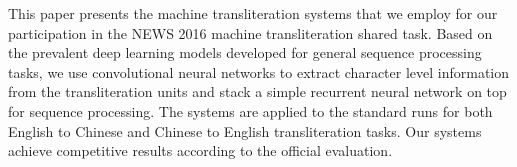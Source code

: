 This paper presents the machine transliteration systems that we employ for our participation in the NEWS 2016 machine transliteration shared task. Based on the prevalent deep learning models developed for general sequence processing tasks, we use convolutional neural networks to extract character level information from the transliteration units and stack a simple recurrent neural network on top for sequence processing. The systems are applied to the standard runs for both English to Chinese and Chinese to English transliteration tasks. Our systems achieve competitive results according to the official evaluation.
